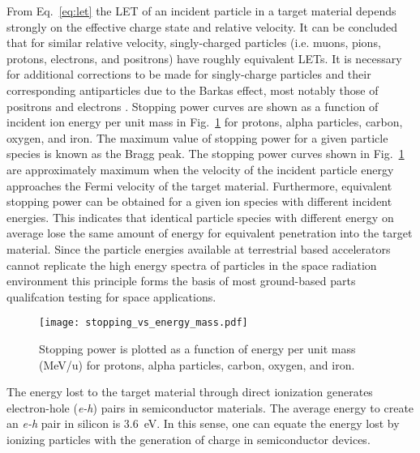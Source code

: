 From Eq.~\ref{eq:let} the LET of an incident particle in a target material depends strongly on the effective charge state and relative velocity.
It can be concluded that for similar relative velocity, singly-charged particles (i.e. muons, pions, protons, electrons, and positrons) have roughly equivalent LETs.
It is necessary for additional corrections to be made for singly-charge particles and their corresponding antiparticles due to the Barkas effect, most notably those of positrons and electrons \cite{bichsel2010passage}.
Stopping power curves are shown as a function of incident ion energy per unit mass in Fig.~\ref{fig:stopping-power-vs-energy-per-mass} for protons, alpha particles, carbon, oxygen, and iron.
The maximum value of stopping power for a given particle species is known as the Bragg peak.
The stopping power curves shown in Fig.~\ref{fig:stopping-power-vs-energy-per-mass} are approximately maximum when the velocity of the incident particle energy approaches the Fermi velocity of the target material.
Furthermore, equivalent stopping power can be obtained for a given ion species with different incident energies.
This indicates that identical particle species with different energy on average lose the same amount of energy for equivalent penetration into the target material.
Since the particle energies available at terrestrial based accelerators cannot replicate the high energy spectra of particles in the space radiation environment this principle forms the basis of most ground-based parts qualifcation testing for space applications.

\begin{figure}[tb]
    \begin{center}
        \texttt{[image: stopping\_vs\_energy\_mass.pdf]}
    \end{center}
    \caption{Stopping power is plotted as a function of energy per unit mass (MeV/u) for protons, alpha particles, carbon, oxygen, and iron.}
    \label{fig:stopping-power-vs-energy-per-mass}
\end{figure}

The energy lost to the target material through direct ionization generates electron-hole (\emph{e-h}) pairs in semiconductor materials. 
The average energy to create an \emph{e-h} pair in silicon is 3.6~eV.
In this sense, one can equate the energy lost by ionizing particles with the generation of charge in semiconductor devices.

